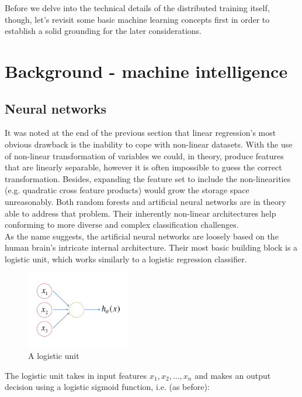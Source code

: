 \documentclass[a4paper, 12pt]{article}
\numberwithin{equation}{section}
\begin{document}
	 Before we delve into the technical details of the distributed training itself, though, let's revisit some basic machine learning concepts first in order to establish a solid grounding for the later considerations.
	
	\section{Background - machine intelligence}
	
	\subsection{Neural networks}
	
	\cite{ng2015coursera} It was noted at the end of the previous section that linear regression's most obvious drawback is the inability to cope with non-linear datasets. With the use of non-linear transformation of variables we could, in theory, produce features that are linearly separable, however it is often impossible to guess the correct transformation. Besides, expanding the feature set to include the non-linearities (e.g. quadratic cross feature products) would grow the storage space unreasonably. Both random forests and artificial neural networks are in theory able to address that problem. Their inherently non-linear architectures help conforming to more diverse and complex classification challenges. \\
	
	As the name suggests, the artificial neural networks are loosely based on the human brain's intricate internal architecture. Their most basic building block is a logistic unit, which works similarly to a logistic regression classifier.
	
	\begin{figure}[!h]
		\centering
		\includegraphics[page=1,width=0.40\textwidth]{logistic_unit.pdf}
		\caption{\label{fig:logistic_unit}{A logistic unit}}
	\end{figure}
	
	The logistic unit takes in input features $x_1, x_2, ..., x_n$ and makes an output decision using a logistic sigmoid function, i.e. (as before):
	
\end{document}

